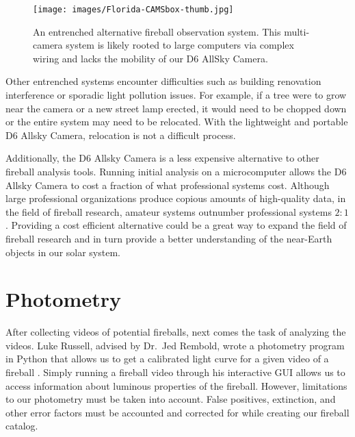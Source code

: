 \begin{figure}[ht!]
  \centering
  \texttt{[image: images/Florida-CAMSbox-thumb.jpg]}
  \caption[An entrenched alternative fireball observation system.]{An entrenched alternative fireball observation system. This multi-camera system is likely rooted to large computers via complex wiring and lacks the mobility of our D6 AllSky Camera.}
  \label{immobile}
\end{figure}

Other entrenched systems encounter difficulties such as building renovation interference or sporadic light pollution issues.
For example, if a tree were to grow near the camera or a new street lamp erected, it would need to be chopped down or the entire system may need to be relocated.
With the lightweight and portable D6 Allsky Camera, relocation is not a difficult process.

Additionally, the D6 Allsky Camera is a less expensive alternative to other fireball analysis tools.
Running initial analysis on a microcomputer allows the D6 Allsky Camera to cost a fraction of what professional systems cost.
Although large professional organizations produce copious amounts of high-quality data, in the field of fireball research, amateur systems outnumber professional systems $2:1$ \cite{gural_review_2005}. 
Providing a cost efficient alternative could be a great way to expand the field of fireball research and in turn provide a better understanding of the near-Earth objects in our solar system.


\section{Photometry}
After collecting videos of potential fireballs, next comes the task of analyzing the videos.
Luke Russell, advised by Dr.~Jed Rembold, wrote a photometry program in Python that allows us to get a calibrated light curve for a given video of a fireball \cite{russell_photometry_2018}.
Simply running a fireball video through his interactive GUI allows us to access information about luminous properties of the fireball.
However, limitations to our photometry must be taken into account.
False positives, extinction, and other error factors must be accounted and corrected for while creating our fireball catalog.

